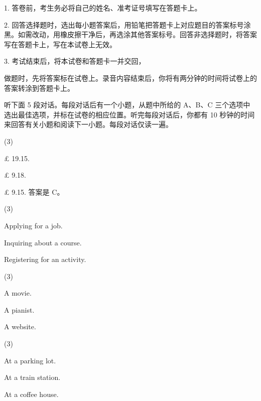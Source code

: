 \documentclass{英语试卷}
\begin{document}
\begin{notice}
\par 1. 答卷前，考生务必将自己的姓名、准考证号填写在答题卡上。\par
\par 2. 回答选择题时，选出每小题答案后，用铅笔把答题卡上对应题目的答案标号涂黑。如需改动，用橡皮擦干净后，再选涂其他答案标号。回答非选择题时，将答案写在答题卡上，写在本试卷上无效。\par
\par 3. 考试结束后，将本试卷和答题卡一并交回，\par
\end{notice}
\par 做题时，先将答案标在试卷上。录音内容结束后，你将有两分钟的时间将试卷上的答案转涂到答题卡上。\par
{}
\par 听下面 5 段对话。每段对话后有一个小题，从题中所给的 A、B、C 三个选项中选出最佳选项，并标在试卷的相应位置。听完每段对话后，你都有 10 秒钟的时间来回答有关小题和阅读下一小题。每段对话仅读一遍。\par
{}
\begin{choices}(3)
  \item £ 19.15.
  \item £ 9.18.
  \item £ 9.15. 答案是 C。
\end{choices}
\begin{choices}(3)
  \item Applying for a job.
  \item Inquiring about a course.
  \item Registering for an activity.
\end{choices}
\begin{choices}(3)
  \item A movie.
  \item A pianist.
  \item A website.
\end{choices}
\begin{choices}(3)
  \item At a parking lot.
  \item At a train station.
  \item At a coffee house.
\end{choices}
\end{document}
